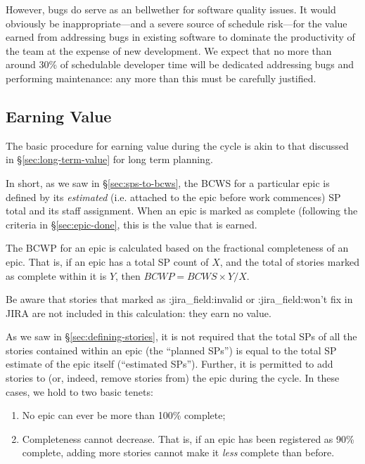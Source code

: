 However, bugs do serve as an bellwether for software quality issues. It
would obviously be inappropriate---and a severe source of schedule
risk---for the value earned from addressing bugs in existing software to
dominate the productivity of the team at the expense of new development.
We expect that no more than around 30\% of schedulable developer time
will be dedicated addressing bugs and performing maintenance: any more
than this must be carefully justified.

\subsection{Earning Value}
\label{sec:cycle-value}

The basic procedure for earning value during the cycle is akin to that discussed in \S\ref{sec:long-term-value} for long term planning.

In short, as we saw in \S\ref{sec:sps-to-bcws}, the
BCWS for a particular epic is defined by its \emph{estimated} (i.e.
attached to the epic before work commences) SP total and its staff
assignment. When an epic
is marked as complete (following the criteria in \S\ref{sec:epic-done}, this is
the value that is earned.

The BCWP for an epic is calculated based on the fractional completeness
of an epic. That is, if an epic has a total SP count of \(X\), and the
total of stories marked as complete within it is \(Y\), then
\(BCWP = BCWS \times Y / X\).

Be aware that stories that marked as :jira\_field:invalid or
:jira\_field:won't fix in JIRA are not included in this calculation:
they earn no value.

As we saw in \S\ref{sec:defining-stories}, it is not
required that the total SPs of all the stories contained within an epic
(the ``planned SPs'') is equal to the total SP estimate of the epic
itself (``estimated SPs''). Further, it is permitted to add stories to
(or, indeed, remove stories from) the epic during the cycle. In these
cases, we hold to two basic tenets:

\begin{enumerate}
\item
  No epic can ever be more than 100\% complete;
\item
  Completeness cannot decrease. That is, if an epic has been registered
  as 90\% complete, adding more stories cannot make it \emph{less}
  complete than before.
\end{enumerate}

